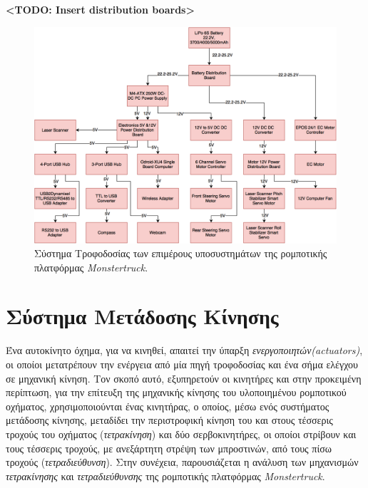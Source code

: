 \bigskip
\begin{center}
\textbf{<TODO: Insert distribution boards>}
\end{center}

\bigskip
\begin{figure}[!ht]
	\centering
	\includegraphics[width=0.8\linewidth]{Chapters/Chapter2/Figures/power_distribution.png}
	\caption{Σύστημα Τροφοδοσίας των επιμέρους υποσυστημάτων της ρομποτικής πλατφόρμας \textit{Monstertruck}.}
	\label{fig:power_distribution}
\end{figure}



\newpage
\section{Σύστημα Μετάδοσης Κίνησης}
Ένα αυτοκίνητο όχημα, για να κινηθεί, απαιτεί την ύπαρξη \textit{ενεργοποιητών(actuators)}, οι οποίοι μετατρέπουν την ενέργεια από μία πηγή τροφοδοσίας και ένα σήμα ελέγχου σε μηχανική κίνηση. Τον σκοπό αυτό, εξυπηρετούν οι κινητήρες και στην προκειμένη περίπτωση, για την επίτευξη της μηχανικής κίνησης του υλοποιημένου ρομποτικού οχήματος, χρησιμοποιούνται ένας κινητήρας, ο οποίος, μέσω ενός συστήματος μετάδοσης κίνησης, μεταδίδει την περιστροφική κίνηση του και στους τέσσερις τροχούς του οχήματος (\textit{τετρακίνηση}) και δύο σερβοκινητήρες, οι οποίοι στρίβουν και τους τέσσερις τροχούς, με ανεξάρτητη στρέψη των μπροστινών, από τους πίσω τροχούς  (\textit{τετραδιεύθυνση}). Στην συνέχεια, παρουσιάζεται η ανάλυση των μηχανισμών \textit{τετρακίνησης} και \textit{τετραδιεύθυνσης} της ρομποτικής πλατφόρμας \textit{Monstertruck}.


